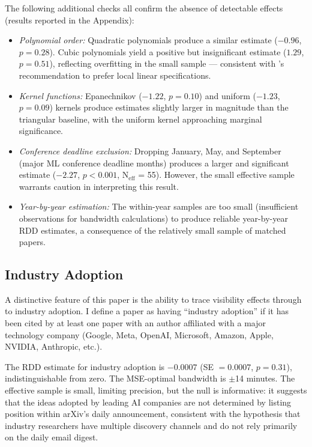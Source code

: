 \documentclass[12pt]{article}
\begin{document}
The following additional checks all confirm the absence of detectable effects (results reported in the Appendix):

\begin{itemize}
\item \textit{Polynomial order:} Quadratic polynomials produce a similar estimate ($-0.96$, $p = 0.28$). Cubic polynomials yield a positive but insignificant estimate ($1.29$, $p = 0.51$), reflecting overfitting in the small sample --- consistent with \citet{gelman2019}'s recommendation to prefer local linear specifications.
\item \textit{Kernel functions:} Epanechnikov ($-1.22$, $p = 0.10$) and uniform ($-1.23$, $p = 0.09$) kernels produce estimates slightly larger in magnitude than the triangular baseline, with the uniform kernel approaching marginal significance.
\item \textit{Conference deadline exclusion:} Dropping January, May, and September (major ML conference deadline months) produces a larger and significant estimate ($-2.27$, $p < 0.001$, N$_{\text{eff}}$ = 55). However, the small effective sample warrants caution in interpreting this result.
\item \textit{Year-by-year estimation:} The within-year samples are too small (insufficient observations for bandwidth calculations) to produce reliable year-by-year RDD estimates, a consequence of the relatively small sample of matched papers.
\end{itemize}


\subsection{Industry Adoption}

A distinctive feature of this paper is the ability to trace visibility effects through to industry adoption. I define a paper as having ``industry adoption'' if it has been cited by at least one paper with an author affiliated with a major technology company (Google, Meta, OpenAI, Microsoft, Amazon, Apple, NVIDIA, Anthropic, etc.).

The RDD estimate for industry adoption is $-0.0007$ (SE $= 0.0007$, $p = 0.31$), indistinguishable from zero. The MSE-optimal bandwidth is $\pm$14 minutes. The effective sample is small, limiting precision, but the null is informative: it suggests that the ideas adopted by leading AI companies are not determined by listing position within arXiv's daily announcement, consistent with the hypothesis that industry researchers have multiple discovery channels and do not rely primarily on the daily email digest.
\end{document}
